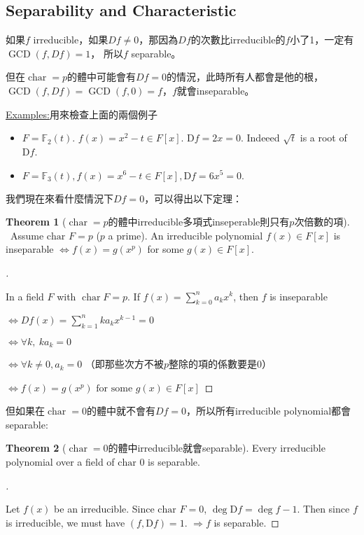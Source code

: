 \documentclass{article}
\theoremstyle{definition}
\newtheorem{thm}{Theorem}
\newcommand{\ex}{\noindent\underline{Examples:}}
\newenvironment{proofs}[1][\proofname]{%
  \begin{proof}[#1]$ $\par\nobreak\ignorespaces
}{%
  \end{proof}
}
\newcommand{\FF}{\mathbb F}
\DeclareMathOperator{\Char}{char}
\DeclareMathOperator{\GCD}{GCD}
\begin{document}
\subsection{Separability and Characteristic}

如果$f$ irreducible，如果$Df\neq 0$，那因為$Df$的次數比irreducible的$f$小了1，一定有$\GCD(f,Df)=1$，
所以$f$ separable。

但在$\Char=p$的體中可能會有$Df=0$的情況，此時所有人都會是他的根，
$\GCD(f,Df)=\GCD(f,0)=f$，$f$就會inseparable。

\ex 用來檢查上面的兩個例子

\begin{itemize}
	\item 	$F = \mathbb{F}_2(t)$. $f(x) = x^2 - t \in F[x]$.
	$\mathrm{D} f = 2x = 0$.
	Indeeed $\sqrt{t}$ is a root of $\mathrm{D} f$.
	\item $F = \FF_3(t), f(x)=x^6-t\in F[x], \mathrm{D}f=6x^5=0.$
\end{itemize}
我們現在來看什麼情況下$Df=0$，可以得出以下定理：
\begin{thm}[$\Char=p$的體中irreducible多項式inseperable則只有$p$次倍數的項]\label{charp_irred_sep}
	\ \newline \indent Assume $\text{char } F = p$ ($p$ a prime).
	An irreducible polynomial $f(x) \in F[x]$ is inseparable $\Leftrightarrow f(x) = g(x^p)$ for some $g(x) \in F[x]$.
\end{thm}

\begin{proofs}
	\noindent In a field $F$ with $\Char F=p$. If $f(x)=\sum_{k=0}^n a_k x^k$, 
	then $f$ is inseparable
	
	$\iff Df(x)=\sum_{k=1}^n ka_k x^{k-1}=0$
	
	$\iff \forall k,\ ka_k=0$
	
	$\iff \forall k\neq 0, a_k=0$ （即那些次方不被$p$整除的項的係數要是0）
	
	$\iff f(x)=g(x^p) \text{ for some } g(x)\in F[x]$
\end{proofs}

\noindent 但如果在$\Char=0$的體中就不會有$Df=0$，所以所有irreducible polynomial都會separable:
\begin{thm}[$\Char=0$的體中irreducible就會separable]\label{char0_irred_sep}
	Every irreducible polynomial over a field of $\text{char } 0$ is separable.
\end{thm}

\begin{proofs}
	Let $f(x)$ be an irreducible.
	Since $\text{char } F = 0$, $\deg \mathrm{D} f = \deg f - 1$.
	Then since $f$ is irreducible, we must have $(f, \mathrm{D} f) = 1$.
	$\Rightarrow f$ is separable.
\end{proofs}
\end{document}
